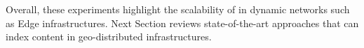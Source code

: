 



\begin{asparadesc}
\item[Overall,] these experiments highlight the scalability of \NAME
  in dynamic networks such as Edge infrastructures. Next
  Section reviews state-of-the-art approaches that can index content
  in geo-distributed infrastructures.
\end{asparadesc}



